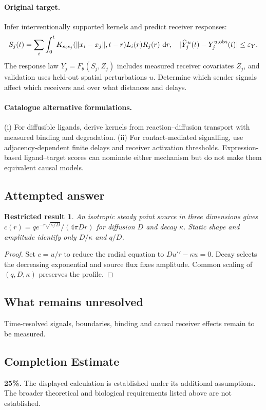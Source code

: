 \documentclass[11pt]{article}
\newcommand{\dd}{\,\mathrm d}
\newtheorem{attemptresult}{Restricted result}[section]
\begin{document}
\paragraph{Original target.}
Infer interventionally supported kernels and predict receiver responses:
\[
S_j(t)=\sum_i\int_0^tK_{s_i s_j}(\|x_i-x_j\|,t-r)L_i(r)R_j(r)\,\dd r,
\quad |\widehat Y_j^u(t)-Y_j^{u,\rm obs}(t)|\leq\varepsilon_Y.
\]
The response law $Y_j=F_\theta(S_j,Z_j)$ includes measured receiver covariates $Z_j$, and validation uses held-out spatial perturbations $u$. Determine which sender signals affect which receivers and over what distances and delays.
\paragraph{Catalogue alternative formulations.}
(i) For diffusible ligands, derive kernels from reaction--diffusion transport with measured binding and degradation. (ii) For contact-mediated signalling, use adjacency-dependent finite delays and receiver activation thresholds. Expression-based ligand--target scores can nominate either mechanism but do not make them equivalent causal models.
\subsection{Attempted answer}
\begin{attemptresult}
An isotropic steady point source in three dimensions gives $c(r)=q e^{-r\sqrt{\kappa/D}}/(4\pi Dr)$ for diffusion $D$ and decay $\kappa$. Static shape and amplitude identify only $D/\kappa$ and $q/D$.
\end{attemptresult}
\begin{proof}
Set $c=u/r$ to reduce the radial equation to $Du\prime\prime-\kappa u=0$. Decay selects the decreasing exponential and source flux fixes amplitude. Common scaling of $(q,D,\kappa)$ preserves the profile.
\end{proof}
\subsection{What remains unresolved}
Time-resolved signals, boundaries, binding and causal receiver effects remain to be measured.
\subsection{Completion Estimate}
\textbf{25\%.} The displayed calculation is established under its additional assumptions. The broader theoretical and biological requirements listed above are not established.
\end{document}
